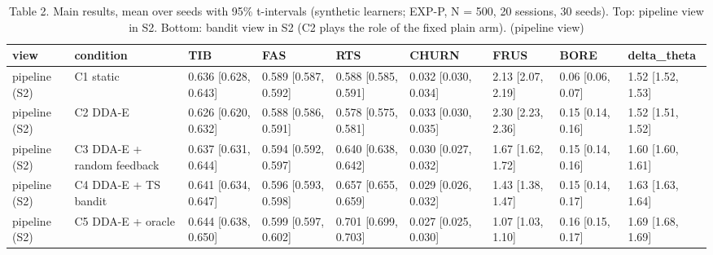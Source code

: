 \begin{table}[H]
\caption{Table 2. Main results, mean over seeds with 95\% t-intervals (synthetic learners; EXP-P, N = 500, 20 sessions, 30 seeds). Top: pipeline view in S2. Bottom: bandit view in S2 (C2 plays the role of the fixed plain arm). (pipeline view)}
\label{tab:table2a_pipeline}
\centering
\small
\begin{tabular}{lllllllll}
\toprule
view & condition & TIB & FAS & RTS & CHURN & FRUS & BORE & delta\_theta \\
\midrule
pipeline (S2) & C1 static & 0.636 [0.628, 0.643] & 0.589 [0.587, 0.592] & 0.588 [0.585, 0.591] & 0.032 [0.030, 0.034] & 2.13 [2.07, 2.19] & 0.06 [0.06, 0.07] & 1.52 [1.52, 1.53] \\
pipeline (S2) & C2 DDA-E & 0.626 [0.620, 0.632] & 0.588 [0.586, 0.591] & 0.578 [0.575, 0.581] & 0.033 [0.030, 0.035] & 2.30 [2.23, 2.36] & 0.15 [0.14, 0.16] & 1.52 [1.51, 1.52] \\
pipeline (S2) & C3 DDA-E + random feedback & 0.637 [0.631, 0.644] & 0.594 [0.592, 0.597] & 0.640 [0.638, 0.642] & 0.030 [0.027, 0.032] & 1.67 [1.62, 1.72] & 0.15 [0.14, 0.16] & 1.60 [1.60, 1.61] \\
pipeline (S2) & C4 DDA-E + TS bandit & 0.641 [0.634, 0.647] & 0.596 [0.593, 0.598] & 0.657 [0.655, 0.659] & 0.029 [0.026, 0.032] & 1.43 [1.38, 1.47] & 0.15 [0.14, 0.17] & 1.63 [1.63, 1.64] \\
pipeline (S2) & C5 DDA-E + oracle & 0.644 [0.638, 0.650] & 0.599 [0.597, 0.602] & 0.701 [0.699, 0.703] & 0.027 [0.025, 0.030] & 1.07 [1.03, 1.10] & 0.16 [0.15, 0.17] & 1.69 [1.68, 1.69] \\
\bottomrule
\end{tabular}
\end{table}
